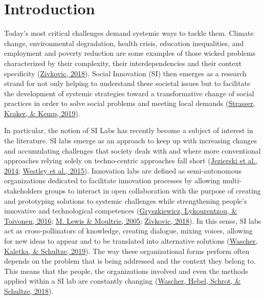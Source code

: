 \documentclass[]{elsarticle} %
\begin{document}
\hypertarget{introduction}{%
\section{Introduction}\label{introduction}}

Today's most critical challenges demand systemic ways to tackle them.
Climate change, environmental degradation, health crisis, education
inequalities, and employment and poverty reduction are some examples of
those wicked problems characterized by their complexity, their
interdependencies and their context specificity
(\protect\hyperlink{ref-Zivkovic2018}{Zivkovic, 2018}). Social
Innovation (SI) then emerges as a research strand for not only helping
to understand these societal issues but to facilitate the development of
systemic strategies toward a transformative change of social practices
in order to solve social problems and meeting local demands
(\protect\hyperlink{ref-Strasser2019}{Strasser, Kraker, \& Kemp, 2019}).

In particular, the notion of SI Labs has recently become a subject of
interest in the literature. SI labs emerge as an approach to keep up
with increasing changes and accumulating challenges that society deals
with and where more conventional approaches relying solely on
techno-centric approaches fall short
(\protect\hyperlink{ref-Jezierski2014}{Jezierski et al., 2014};
\protect\hyperlink{ref-Westley2015}{Westley et al., 2015}). Innovation
labs are defined as semi-autonomous organizations dedicated to
facilitate innovation processes by allowing multi-stakeholders groups to
interact in open collaboration with the purpose of creating and
prototyping solutions to systemic challenges while strengthening
people's innovative and technological competences
(\protect\hyperlink{ref-Gryszkiewicz2016}{Gryszkiewicz, Lykourentzou, \&
Toivonen, 2016}; \protect\hyperlink{ref-Lewis2005}{M. Lewis \& Moultrie,
2005}; \protect\hyperlink{ref-Zivkovic2018}{Zivkovic, 2018}). In this
sense, SI labs act as cross-pollinators of knowledge, creating dialogue,
mixing voices, allowing for new ideas to appear and to be translated
into alternative solutions (\protect\hyperlink{ref-Wascher2019}{Wascher,
Kaletka, \& Schultze, 2019}). The way these organizational forms perform
often depends on the problem that is being addressed and the context
they belong to. This means that the people, the organizations involved
and even the methods applied within a SI lab are constantly changing
(\protect\hyperlink{ref-Wascher2018}{Wascher, Hebel, Schrot, \&
Schultze, 2018}).
\end{document}

